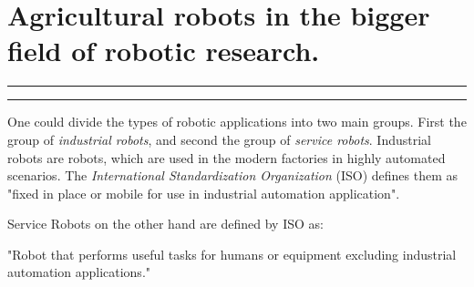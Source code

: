         \section{Agricultural robots in the bigger field of robotic research.}

        \vspace{10px}
        \hrule
        \vspace{10px}


        \vspace{10px}
        \hrule
        \vspace{10px}

        One could divide the types of robotic applications into two main groups. First the group of \emph{industrial robots}, and second the group of \emph{service robots}. 
        Industrial robots are robots, which are used in the modern factories in highly automated scenarios. The \emph{International Standardization Organization} (ISO) defines them as "fixed in place or mobile for use in industrial automation application". 
        
        Service Robots on the other hand are defined by ISO as:
        \begin{displayquote}
            "Robot that performs useful tasks for humans or equipment excluding industrial automation applications."
        \end{displayquote} 

